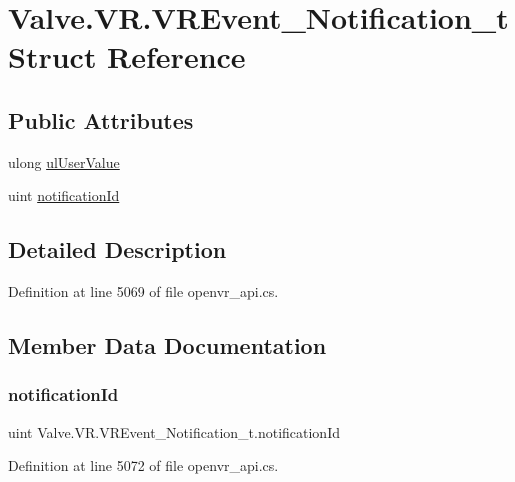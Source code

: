 \hypertarget{struct_valve_1_1_v_r_1_1_v_r_event___notification__t}{}\section{Valve.\+V\+R.\+V\+R\+Event\+\_\+\+Notification\+\_\+t Struct Reference}
\label{struct_valve_1_1_v_r_1_1_v_r_event___notification__t}
\subsection*{Public Attributes}
\begin{DoxyCompactItemize}
\item 
ulong \mbox{\hyperlink{struct_valve_1_1_v_r_1_1_v_r_event___notification__t_a96745266660383895c654a5d8906d75a}{ul\+User\+Value}}
\item 
uint \mbox{\hyperlink{struct_valve_1_1_v_r_1_1_v_r_event___notification__t_a96376f93d2de8da11abe4e09e586aa0a}{notification\+Id}}
\end{DoxyCompactItemize}


\subsection{Detailed Description}


Definition at line 5069 of file openvr\+\_\+api.\+cs.



\subsection{Member Data Documentation}
\mbox{\label{struct_valve_1_1_v_r_1_1_v_r_event___notification__t_a96376f93d2de8da11abe4e09e586aa0a}} 
\subsubsection{\texorpdfstring{notificationId}{notificationId}}
{\footnotesize\ttfamily uint Valve.\+V\+R.\+V\+R\+Event\+\_\+\+Notification\+\_\+t.\+notification\+Id}



Definition at line 5072 of file openvr\+\_\+api.\+cs.

